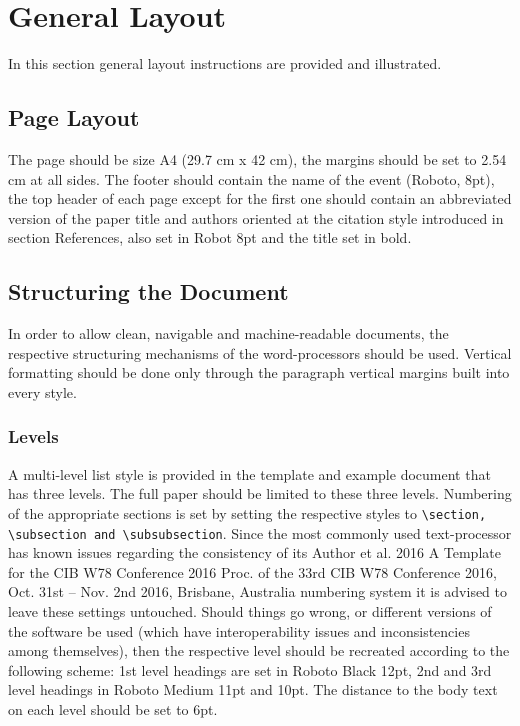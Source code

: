 \section{General Layout}

In this section general layout instructions are provided and illustrated. 
\subsection{Page Layout}
The page should be size A4 (29.7 cm x 42 cm), the margins should be set to 2.54 cm at all sides. The footer should contain the name of the event (Roboto, 8pt), the top header of each page except for the first one should contain an abbreviated version of the paper title and authors oriented at the citation style introduced in section References, also set in Robot 8pt and the title set in bold.
\subsection{Structuring the Document}
In order to allow clean, navigable and machine-readable documents, the respective structuring mechanisms of the word-processors should be used. Vertical formatting should be done only through the paragraph vertical margins built into every style. 

\subsubsection{Levels}
A multi-level list style is provided in the template and example document that has three levels. The full paper should be limited to these three levels. Numbering of the appropriate sections is 
set by setting the respective styles to \texttt{\textbackslash section, \textbackslash subsection and \textbackslash subsubsection}. Since the most commonly used text-processor has known issues regarding the consistency of its Author et al. 2016 A Template for the CIB W78 Conference 2016 Proc. of the 33rd CIB W78 Conference 2016, Oct. 31st  – Nov. 2nd  2016, Brisbane, Australia numbering system it is advised to leave these settings untouched. Should things go wrong, or different versions of the software be used (which have interoperability issues and inconsistencies among themselves), then the respective level should be recreated according to the following scheme: 1st level headings are set in Roboto Black 12pt, 2nd and 3rd level headings in Roboto Medium 11pt and 10pt. The distance to the body text on each level should be set to 6pt. 



